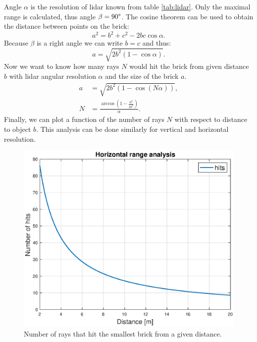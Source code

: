 Angle $\alpha$ is the resolution of lidar known from table \ref{tab:lidar}. Only the maximal range is calculated, thus angle $\beta = 90\degree$. The cosine theorem can be used to obtain the distance between points on the brick:
\begin{equation}
a^2 = b^2 + c^2 - 2bc \cos \alpha.
\end{equation}
Because $\beta$ is a right angle we can write $b = c$ and thus:
\begin{equation}
a = \sqrt{2b^2 \left(1-\cos \alpha \right)}.
\end{equation}
Now we want to know how many rays $N$ would hit the brick from given distance $b$ with lidar angular resolution $\alpha$ and the size of the brick $a$. 
\begin{align}
a &= \sqrt{2b^2 \left(1-\cos \left( N \alpha \right) \right)}, \\
N &= \frac{\arccos\left(1-\frac{a^2}{2b^2}\right) }{\alpha}.
\label{eq:rays}
\end{align}
Finally, we can plot a function of the number of rays $N$ with respect to distance to object $b$. This analysis can be done similarly for vertical and horizontal resolution.

\begin{figure}[H]
	\centering
	\includegraphics[scale=0.55]{fig/horizontal_range.eps}
	\caption[Horizontal range chart]{Number of rays that hit the smallest brick from a given distance.}
	\label{fig:horizontal_hits}
\end{figure}

